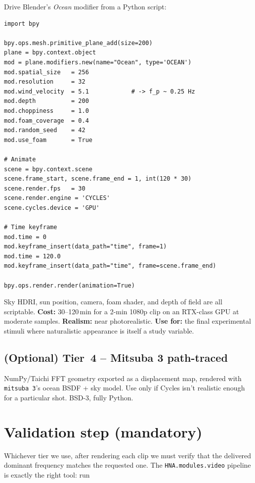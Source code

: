 \documentclass[11pt,a4paper]{article}
\newcommand{\code}[1]{\texttt{\small #1}}
\begin{document}
Drive Blender's \emph{Ocean} modifier from a Python script:

\begin{lstlisting}
import bpy

bpy.ops.mesh.primitive_plane_add(size=200)
plane = bpy.context.object
mod = plane.modifiers.new(name="Ocean", type='OCEAN')
mod.spatial_size   = 256
mod.resolution     = 32
mod.wind_velocity  = 5.1            # -> f_p ~ 0.25 Hz
mod.depth          = 200
mod.choppiness     = 1.0
mod.foam_coverage  = 0.4
mod.random_seed    = 42
mod.use_foam       = True

# Animate
scene = bpy.context.scene
scene.frame_start, scene.frame_end = 1, int(120 * 30)
scene.render.fps   = 30
scene.render.engine = 'CYCLES'
scene.cycles.device = 'GPU'

# Time keyframe
mod.time = 0
mod.keyframe_insert(data_path="time", frame=1)
mod.time = 120.0
mod.keyframe_insert(data_path="time", frame=scene.frame_end)

bpy.ops.render.render(animation=True)
\end{lstlisting}

Sky HDRI, sun position, camera, foam shader, and depth of field are all
scriptable. \textbf{Cost:} 30--120\,min for a 2-min 1080p clip on an
RTX-class GPU at moderate samples. \textbf{Realism:} near
photorealistic. \textbf{Use for:} the final experimental stimuli where
naturalistic appearance is itself a study variable.

\subsection{(Optional) Tier~4 -- Mitsuba 3 path-traced}

NumPy/Taichi FFT geometry exported as a displacement map, rendered with
\code{mitsuba 3}'s ocean BSDF + sky model. Use only if Cycles isn't
realistic enough for a particular shot. BSD-3, fully Python.

\section{Validation step (mandatory)}

Whichever tier we use, after rendering each clip we must verify that the
delivered dominant frequency matches the requested one. The
\code{HNA.modules.video} pipeline is exactly the right tool: run
\end{document}
